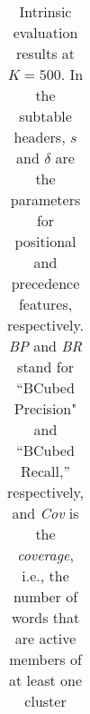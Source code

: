 \begin{table}[htb]
{\begin{tabular}{cc|cccrr}

\end{tabular}
}
\caption{Intrinsic evaluation results at $K = 500$. In the subtable headers, $s$ and $\delta$ are the parameters for positional and precedence features, respectively. \textit{BP} and \textit{BR} stand for ``BCubed Precision" and ``BCubed Recall,'' respectively, and \textit{Cov} is the \textit{coverage}, i.e., the number of words that are active members of at least one cluster} %
\label{tab:results-500-2}
\end{table}

